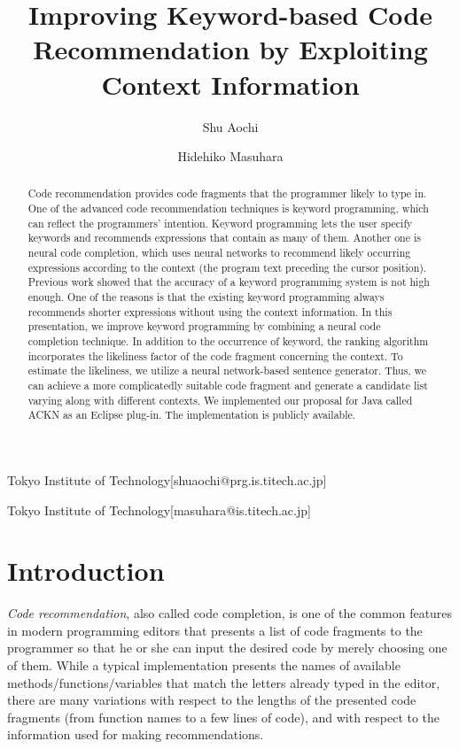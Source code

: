 \documentclass[PRO,english]{ipsj}
\begin{document}
\title{Improving Keyword-based Code Recommendation by Exploiting Context Information}
\author{Shu Aochi}{Tokyo Institute of Technology}[shuaochi@prg.is.titech.ac.jp]
\author{Hidehiko Masuhara}{Tokyo Institute of Technology}[masuhara@is.titech.ac.jp]

\begin{abstract}
Code recommendation provides code fragments that the programmer likely to type in. One of the advanced code recommendation techniques is keyword programming, which can reflect the programmers' intention. Keyword programming lets the user specify keywords and recommends expressions that contain as many of them. Another one is neural code completion, which uses neural networks to recommend likely occurring expressions according to the context (the program text preceding the cursor position). Previous work showed that the accuracy of a keyword programming system is not high enough. One of the reasons is that the existing keyword programming always recommends shorter expressions without using the context information. In this presentation, we improve keyword programming by combining a neural code completion technique. In addition to the occurrence of keyword, the ranking algorithm incorporates the likeliness factor of the code fragment concerning the context. To estimate the likeliness, we utilize a neural network-based sentence generator. Thus, we can achieve a more complicatedly suitable code fragment and generate a candidate list varying along with different contexts. We implemented our proposal for Java called ACKN as an Eclipse plug-in. The implementation is publicly available.
\end{abstract}

\maketitle

\section{Introduction}

\emph{Code recommendation}, also called code completion, is one of the common features in modern programming editors that presents a list of code fragments to the programmer so that he or she can input the desired code by merely choosing one of them.
While a typical implementation presents the names of available methods/functions/variables that match the letters already typed in the editor, 
there are many variations with respect to the lengths of the presented code fragments (from function names to a few lines of code), and with respect to the information used for making recommendations.
\end{document}
